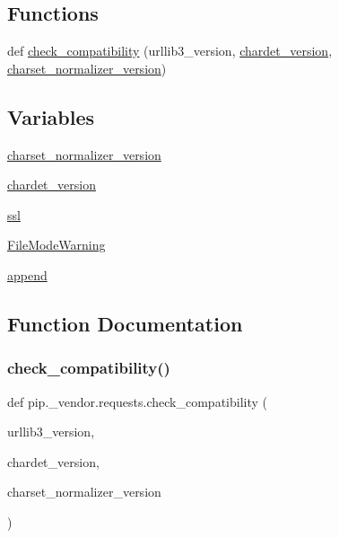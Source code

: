 \subsection*{Functions}
\begin{DoxyCompactItemize}
\item 
def \hyperlink{namespacepip_1_1__vendor_1_1requests_afac6fb2e304d0bdeeb3797d48998fd24}{check\+\_\+compatibility} (urllib3\+\_\+version, \hyperlink{namespacepip_1_1__vendor_1_1requests_a0489c0432bbd0693c5103b454b5ef7db}{chardet\+\_\+version}, \hyperlink{namespacepip_1_1__vendor_1_1requests_a12ad233ff0ac10e9d91df425e03bb468}{charset\+\_\+normalizer\+\_\+version})
\end{DoxyCompactItemize}
\subsection*{Variables}
\begin{DoxyCompactItemize}
\item 
\hyperlink{namespacepip_1_1__vendor_1_1requests_a12ad233ff0ac10e9d91df425e03bb468}{charset\+\_\+normalizer\+\_\+version}
\item 
\hyperlink{namespacepip_1_1__vendor_1_1requests_a0489c0432bbd0693c5103b454b5ef7db}{chardet\+\_\+version}
\item 
\hyperlink{namespacepip_1_1__vendor_1_1requests_a447f2d86dff42ce6da9835f347ad977b}{ssl}
\item 
\hyperlink{namespacepip_1_1__vendor_1_1requests_a2df473620db131b138d8aa6ee7ed8d70}{File\+Mode\+Warning}
\item 
\hyperlink{namespacepip_1_1__vendor_1_1requests_a3d60a561f70c88b392abad189d6d53b1}{append}
\end{DoxyCompactItemize}


\subsection{Function Documentation}
\mbox{\label{namespacepip_1_1__vendor_1_1requests_afac6fb2e304d0bdeeb3797d48998fd24}} 
\subsubsection{\texorpdfstring{check\+\_\+compatibility()}{check\_compatibility()}}
{\footnotesize\ttfamily def pip.\+\_\+vendor.\+requests.\+check\+\_\+compatibility (\begin{DoxyParamCaption}\item[{}]{urllib3\+\_\+version,  }\item[{}]{chardet\+\_\+version,  }\item[{}]{charset\+\_\+normalizer\+\_\+version }\end{DoxyParamCaption})}



